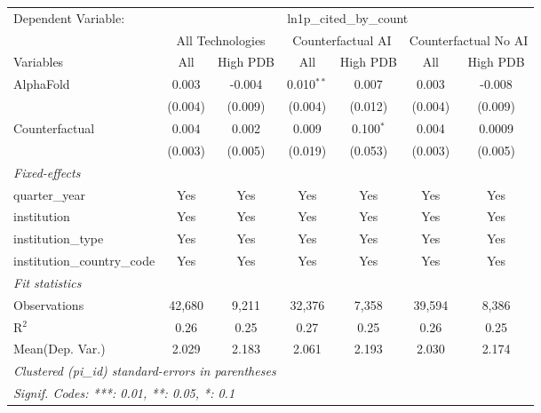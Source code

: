 \begingroup
\centering
\begin{tabular}{lcccccc}
   \tabularnewline \midrule \midrule
   Dependent Variable: & \multicolumn{6}{c}{ln1p\_cited\_by\_count}\\
 & \multicolumn{2}{c}{All Technologies} & \multicolumn{2}{c}{Counterfactual AI} & \multicolumn{2}{c}{Counterfactual No AI} \\
\cmidrule(lr){1-1}\cmidrule(lr){2-3} \cmidrule(lr){4-5} \cmidrule(lr){6-7}
Variables & \multicolumn{1}{c}{All} & \multicolumn{1}{c}{High PDB} & \multicolumn{1}{c}{All} & \multicolumn{1}{c}{High PDB} & \multicolumn{1}{c}{All} & \multicolumn{1}{c}{High PDB} \\
\cmidrule(lr){1-1}\cmidrule(lr){2-2} \cmidrule(lr){3-3} \cmidrule(lr){4-4} \cmidrule(lr){5-5} \cmidrule(lr){6-6} \cmidrule(lr){7-7}
   AlphaFold                    & 0.003   & -0.004  & 0.010$^{**}$ & 0.007       & 0.003   & -0.008\\   
                                & (0.004) & (0.009) & (0.004)      & (0.012)     & (0.004) & (0.009)\\   
   Counterfactual               & 0.004   & 0.002   & 0.009        & 0.100$^{*}$ & 0.004   & 0.0009\\   
                                & (0.003) & (0.005) & (0.019)      & (0.053)     & (0.003) & (0.005)\\   
   \midrule
   \emph{Fixed-effects}\\
   quarter\_year                & Yes     & Yes     & Yes          & Yes         & Yes     & Yes\\  
   institution                  & Yes     & Yes     & Yes          & Yes         & Yes     & Yes\\  
   institution\_type            & Yes     & Yes     & Yes          & Yes         & Yes     & Yes\\  
   institution\_country\_code   & Yes     & Yes     & Yes          & Yes         & Yes     & Yes\\  
   \midrule
   \emph{Fit statistics}\\
   Observations                 & 42,680  & 9,211   & 32,376       & 7,358       & 39,594  & 8,386\\  
   R$^2$                        & 0.26    & 0.25    & 0.27         & 0.25        & 0.26    & 0.25\\  
Mean(Dep. Var.) & 2.029 & 2.183 & 2.061 & 2.193 & 2.030 & 2.174 \\
   \midrule \midrule
   \multicolumn{7}{l}{\emph{Clustered (pi\_id) standard-errors in parentheses}}\\
   \multicolumn{7}{l}{\emph{Signif. Codes: ***: 0.01, **: 0.05, *: 0.1}}\\
\end{tabular}
\par\endgroup
